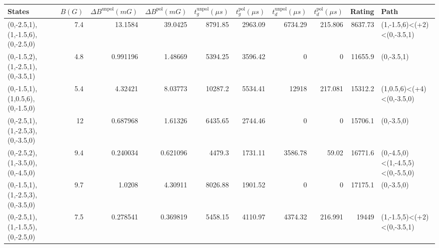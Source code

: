 \begin{tabular}{lrrrrrrrrl}
\hline
 {States}                         &   {$B(G)$} &   {$\Delta B^{\text{unpol}}(mG)$} &   {$\Delta B^{\text{pol}}(mG)$} &   {$t^{\text{unpol}}_{g}(\mu s)$} &   {$t^{\text{pol}}_{g}(\mu s)$} &   {$t^{\text{unpol}}_{d}(\mu s)$} &   {$t^{\text{pol}}_{d}(\mu s)$} &   {Rating} & {Path}                           \\
\hline
 (0,-2.5,1),(1,-1.5,6),(0,-2.5,0) &        7.4 &                         13.1584   &                       39.0425   &                           8791.85 &                         2963.09 &                           6734.29 &                         215.806 &    8637.73 & (1,-1.5,6)<(+2)<(0,-3.5,1)       \\
 (0,-1.5,2),(1,-2.5,1),(0,-3.5,1) &        4.8 &                          0.991196 &                        1.48669  &                           5394.25 &                         3596.42 &                              0    &                           0     &   11655.9  & (0,-3.5,1)                       \\
 (0,-1.5,1),(1,0.5,6),(0,-1.5,0)  &        5.4 &                          4.32421  &                        8.03773  &                          10287.2  &                         5534.41 &                          12918    &                         217.081 &   15312.2  & (1,0.5,6)<(+4)<(0,-3.5,0)        \\
 (0,-2.5,1),(1,-2.5,3),(0,-3.5,0) &       12   &                          0.687968 &                        1.61326  &                           6435.65 &                         2744.46 &                              0    &                           0     &   15706.1  & (0,-3.5,0)                       \\
 (0,-2.5,2),(1,-3.5,0),(0,-4.5,0) &        9.4 &                          0.240034 &                        0.621096 &                           4479.3  &                         1731.11 &                           3586.78 &                          59.02  &   16771.6  & (0,-4.5,0)<(1,-4.5,5)<(0,-5.5,0) \\
 (0,-1.5,1),(1,-2.5,3),(0,-3.5,0) &        9.7 &                          1.0208   &                        4.30911  &                           8026.88 &                         1901.52 &                              0    &                           0     &   17175.1  & (0,-3.5,0)                       \\
 (0,-2.5,1),(1,-1.5,5),(0,-2.5,0) &        7.5 &                          0.278541 &                        0.369819 &                           5458.15 &                         4110.97 &                           4374.32 &                         216.991 &   19449    & (1,-1.5,5)<(+2)<(0,-3.5,1)       \\

\end{tabular}
